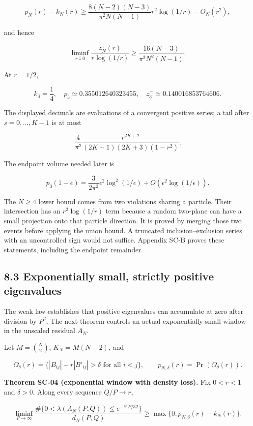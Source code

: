 \documentclass[a4paper,11pt]{article}
\numberwithin{equation}{section}
\begin{document}
\[
p_N(r)-k_N(r)\geq
\frac{8(N-2)(N-3)}{\pi^2N(N-1)}r^2\log(1/r)-O_N(r^2),
\]

and hence

\[
\liminf_{r\downarrow0}\frac{z_N^+(r)}{r\log(1/r)}
\geq\frac{16(N-3)}{\pi^2N^2(N-1)}.
\]

At \(r=1/2\),

\[
k_3=\frac14,\quad p_3\simeq0.355012640323455,\quad
z_3^+\simeq0.140016853764606.
\]

The displayed decimals are evaluations of a convergent positive series; a tail after \(s=0,\ldots,K-1\) is at most

\[
\frac4{\pi^2}\frac{r^{2K+2}}{(2K+1)(2K+3)(1-r^2)}.
\]

The endpoint volume needed later is

\[
p_3(1-\epsilon)=\frac{3}{2\pi^2}\epsilon^2\log^2(1/\epsilon)
+O\!\left(\epsilon^2\log(1/\epsilon)\right).
\]

The \(N\geq4\) lower bound comes from two violations sharing a particle. Their intersection has an \(r^2\log(1/r)\) term because a random two-plane can have a small projection onto that particle direction. It is proved by merging those two events before applying the union bound. A truncated inclusion--exclusion series with an uncontrolled sign would not suffice. Appendix SC-B proves these statements, including the endpoint remainder.

\hypertarget{exponentially-small-strictly-positive-eigenvalues}{%
\subsection{8.3 Exponentially small, strictly positive eigenvalues}\label{exponentially-small-strictly-positive-eigenvalues}}

The weak law establishes that positive eigenvalues can accumulate at zero after division by \(P^2\). The next theorem controls an actual exponentially small window in the unscaled residual \(A_N\).

Let \(M=\binom N2\), \(K_N=M(N-2)\), and

\[
\Omega_\delta(r)=\{|B_{ij}|-r|B'_{ij}|>\delta\text{ for all }i<j\},\qquad
p_{N,\delta}(r)=\Pr(\Omega_\delta(r)).
\]

\textbf{Theorem SC-04 (exponential window with density loss).} Fix \(0<r<1\) and \(\delta>0\). Along every sequence \(Q/P\to r\),

\[
\liminf_{P\to\infty}\frac{
\#\{0<\lambda(A_N(P,Q))\leq e^{-\delta^2P/32}\}}
{d_N(P,Q)}
\geq\max\{0,p_{N,\delta}(r)-k_N(r)\}.
\]
\end{document}
